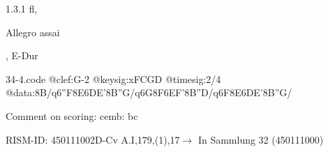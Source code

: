 \documentclass[a4paper, twocolumn, 11pt]{book}
\begin{document}
\newline %
\par 1.3.1  fl, \begin{itshape}Allegro assai\end{itshape}, E-Dur  
\begin{filecontents*}{34-4.code}
@clef:G-2
@keysig:xFCGD
@timesig:2/4
@data:8B/q6''F{8E6DE}{'8B''G}/q6G8{F6EF}'8{B''D}/q6F{8E6DE}'8{B''G}/
\end{filecontents*}
\newline %
\par Comment on scoring: cemb: bc
\par RISM-ID: 450111002\newline D-Cv  A.I,179,(1),17\newline $\rightarrow$ In Sammlung 32 (450111000)
      
\end{document}
